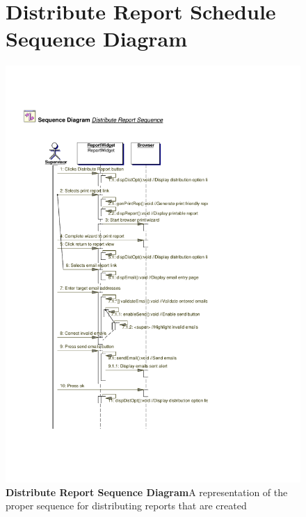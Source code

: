 \documentclass[letterpaper,12pt]{report}
\begin{document}
\begin{figure}[hbp]
 \section{Distribute Report Schedule Sequence Diagram}
 \includegraphics[scale=0.65]{externals/SequenceDiagrams5.pdf}
 \caption{\small
\textbf{Distribute Report Sequence Diagram}\newline A representation of the proper sequence for distributing reports that are created}\label{fig:seqAccessSched}
\end{figure}
\newpage
\end{document}

